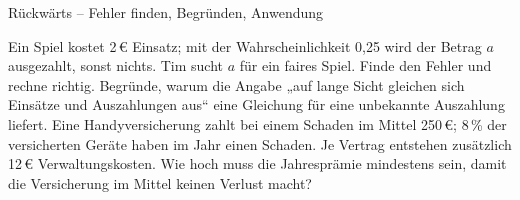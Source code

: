 \begin{aufgabe}{Rückwärts – Fehler finden, Begründen, Anwendung}
\begin{teile}
\teil Ein Spiel kostet 2\,€ Einsatz; mit der Wahrscheinlichkeit 0{,}25 wird der Betrag $a$ ausgezahlt, sonst nichts. Tim sucht $a$ für ein faires Spiel. Finde den Fehler und rechne richtig. 
\teil Begründe, warum die Angabe „auf lange Sicht gleichen sich Einsätze und Auszahlungen aus“ eine Gleichung für eine unbekannte Auszahlung liefert.
\teil Eine Handyversicherung zahlt bei einem Schaden im Mittel 250\,€; 8\,\% der versicherten Geräte haben im Jahr einen Schaden. Je Vertrag entstehen zusätzlich 12\,€ Verwaltungskosten. Wie hoch muss die Jahresprämie mindestens sein, damit die Versicherung im Mittel keinen Verlust macht? \leerfeld[€]
\end{teile}
\end{aufgabe}
